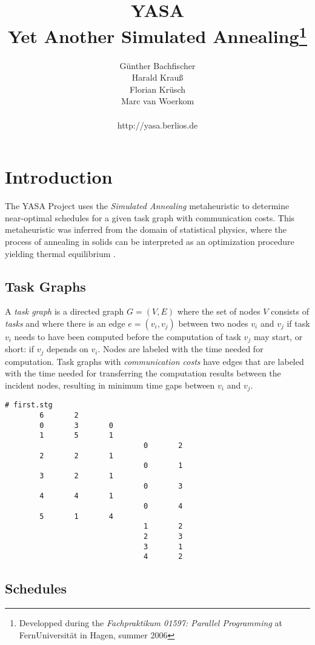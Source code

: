 \documentclass[11pt,a4paper]{report}
\author{G\"unther Bachfischer \\
        Harald Krau\ss{} \\
	Florian Kr\"usch \\
	Marc van Woerkom \\
        \\
        http://yasa.berlios.de}
\title{\textbf{YASA}\\
       {\Large Yet Another Simulated Annealing}\thanks{Developped during the 
       {\em Fachpraktikum 01597: Parallel Programming} 
       at FernUniversit\"at in Hagen, summer 2006}}
\begin{document}
\maketitle

\chapter{Introduction}

The YASA Project uses the {\em Simulated Annealing} metaheuristic to determine
near-optimal schedules for a given task graph with communication costs.
This metaheuristic was inferred from the domain of statistical physics,
where the process of annealing in solids can be interpreted as an optimization
procedure yielding thermal equilibrium \cite{Kirkpatrick1983}.

\section{Task Graphs}
A {\em task graph} is a directed graph $G = (V, E)$ where the set of
nodes $V$ consists of {\em tasks} and where there is an edge $e = (v_i, v_j)$
between two nodes $v_i$ and $v_j$ if task $v_i$ needs to have been computed 
before the computation of task $v_j$ may start, 
or short: if $v_j$ depends on $v_i$. 
Nodes are labeled with the time needed for computation.
Task graphs with {\em communication costs} have edges that are labeled with 
the time needed for transferring the computation results between the 
incident nodes, resulting in minimum time gaps between $v_i$ and $v_j$.


\begin{verbatim}
# first.stg
        6       2
        0       3       0
        1       5       1
                                0       2
        2       2       1
                                0       1
        3       2       1
                                0       3
        4       4       1
                                0       4
        5       1       4
                                1       2
                                2       3
                                3       1
                                4       2
\end{verbatim}

\section{Schedules}
\end{document}
